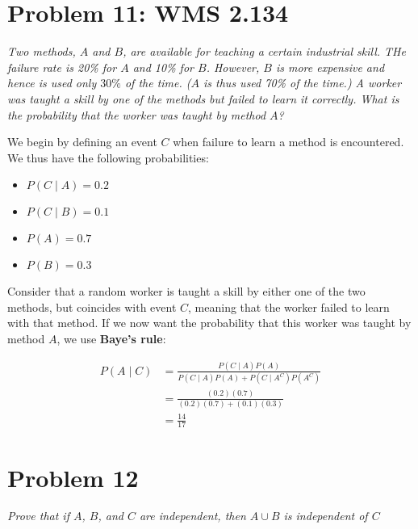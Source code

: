 \documentclass{article}
\begin{document}
\section*{Problem 11: WMS 2.134}
	\emph{Two methods, $A$ and $B$, are available for teaching a certain industrial skill. THe failure rate is 20\% for $A$ and 10\% for $B$. However, $B$ is more expensive and hence is used only $30\%$ of the time. ($A$ is thus used 70\% of the time.) A worker was taught a skill by one of the methods but failed to learn it correctly. What is the probability that the worker was taught by method $A$?}
	\begin{sol}
		We begin by defining an event $C$ when failure to learn a method is encountered. We thus have the following probabilities:
		\begin{multicols}{2}
			\begin{itemize}
				\item $P(C \mid A) = 0.2$ 
				\item $P(C \mid B) = 0.1$
				\item $P(A) = 0.7$
				\item $P(B) = 0.3$
			\end{itemize}
		\end{multicols}
		Consider that a random worker is taught a skill by either one of the two methods, but coincides with event $C$, meaning that the worker failed to learn with that method. If we now want the probability that this worker was taught by method $A$, we use \textbf{Baye's rule}:
		
		\begin{align*}
			P(A \mid C) &= \frac{P(C \mid A) P(A)}{P(C \mid A)P(A) + P(C \mid A^C) P(A^C)} \\
			&= \frac{(0.2)(0.7)}{(0.2)(0.7)+(0.1)(0.3)} \\
			&= \boxed{\frac{14}{17}}
		\end{align*}
	\end{sol}

\pagebreak

\section*{Problem 12}
\emph{Prove that if $A$, $B$, and $C$ are independent, then $A \cup B$ is independent of $C$}
\end{document}
